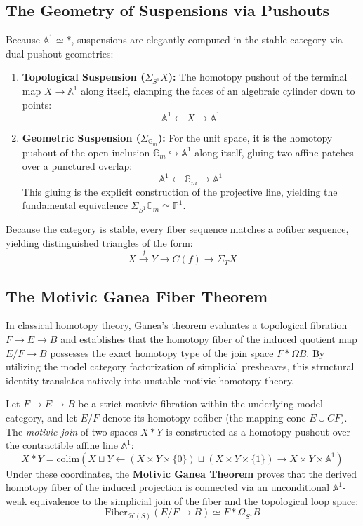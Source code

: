 \documentclass[11pt,oneside]{article}
\begin{document}
    \subsection{The Geometry of Suspensions via Pushouts}
Because $\mathbb{A}^1 \simeq *$, suspensions are elegantly computed in the stable category via dual pushout geometries:
\begin{enumerate}
    \item \textbf{Topological Suspension ($\Sigma_{S^1}X$):} The homotopy pushout of the terminal map $X \to \mathbb{A}^1$ along itself, clamping the faces of an algebraic cylinder down to points:
    \[ \mathbb{A}^1 \longleftarrow X \longrightarrow \mathbb{A}^1 \]
    \item \textbf{Geometric Suspension ($\Sigma_{\mathbb{G}_m}$):} For the unit space, it is the homotopy pushout of the open inclusion $\mathbb{G}_m \hookrightarrow \mathbb{A}^1$ along itself, gluing two affine patches over a punctured overlap:
    \[ \mathbb{A}^1 \longleftarrow \mathbb{G}_m \longrightarrow \mathbb{A}^1 \]
    This gluing is the explicit construction of the projective line, yielding the fundamental equivalence $\Sigma_{S^1}\mathbb{G}_m \simeq \mathbb{P}^1$.
\end{enumerate}
Because the category is stable, every fiber sequence matches a cofiber sequence, yielding distinguished triangles of the form:
\[ X \xrightarrow{\ f\ } Y \longrightarrow C(f) \longrightarrow \Sigma_T X \]

\subsection{The Motivic Ganea Fiber Theorem}
In classical homotopy theory, Ganea's theorem evaluates a topological fibration $F \to E \to B$ and establishes that the homotopy fiber of the induced quotient map $E/F \to B$ possesses the exact homotopy type of the join space $F * \Omega B$. By utilizing the model category factorization of simplicial presheaves, this structural identity translates natively into unstable motivic homotopy theory.

Let $F \to E \to B$ be a strict motivic fibration within the underlying model category, and let $E/F$ denote its homotopy cofiber (the mapping cone $E \cup CF$). The \emph{motivic join} of two spaces $X * Y$ is constructed as a homotopy pushout over the contractible affine line $\mathbb{A}^1$:
\[ X * Y = \text{colim}\left( X \sqcup Y \longleftarrow (X \times Y \times \{0\}) \sqcup (X \times Y \times \{1\}) \longrightarrow X \times Y \times \mathbb{A}^1 \right) \]
Under these coordinates, the \textbf{Motivic Ganea Theorem} proves that the derived homotopy fiber of the induced projection is connected via an unconditional $\mathbb{A}^1$-weak equivalence to the simplicial join of the fiber and the topological loop space:
\[ \text{Fiber}_{\mathcal{H}(S)}\left( E/F \longrightarrow B \right) \simeq F * \Omega_{S^1} B \]
\end{document}
